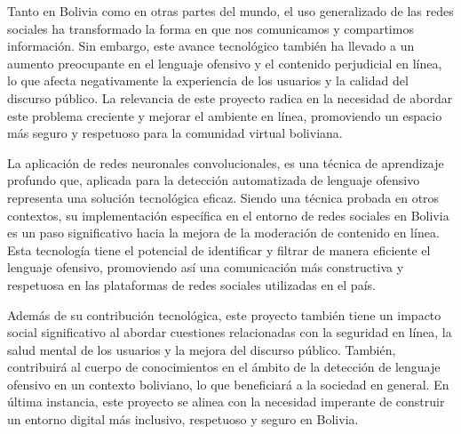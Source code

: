 Tanto en Bolivia como en otras partes del mundo, el uso generalizado de las redes sociales ha transformado la forma en que nos comunicamos y compartimos información. Sin embargo, este avance tecnológico también ha llevado a un aumento preocupante en el lenguaje ofensivo y el contenido perjudicial en línea, lo que afecta negativamente la experiencia de los usuarios y la calidad del discurso público. La relevancia de este proyecto radica en la necesidad de abordar este problema creciente y mejorar el ambiente en línea, promoviendo un espacio más seguro y respetuoso para la comunidad virtual boliviana.

La aplicación de redes neuronales convolucionales, es una técnica de aprendizaje profundo que, aplicada para la detección automatizada de lenguaje ofensivo representa una solución tecnológica eficaz. Siendo una técnica probada en otros contextos, su implementación específica en el entorno de redes sociales en Bolivia es un paso significativo hacia la mejora de la moderación de contenido en línea. Esta tecnología tiene el potencial de identificar y filtrar de manera eficiente el lenguaje ofensivo, promoviendo así una comunicación más constructiva y respetuosa en las plataformas de redes sociales utilizadas en el país.

Además de su contribución tecnológica, este proyecto también tiene un impacto social significativo al abordar cuestiones relacionadas con la seguridad en línea, la salud mental de los usuarios y la mejora del discurso público. También, contribuirá al cuerpo de conocimientos en el ámbito de la detección de lenguaje ofensivo en un contexto boliviano, lo que beneficiará a la sociedad en general. En última instancia, este proyecto se alinea con la necesidad imperante de construir un entorno digital más inclusivo, respetuoso y seguro en Bolivia.
